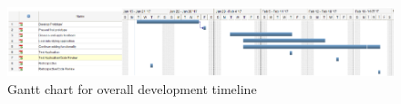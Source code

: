 \begin{figure}[!h]
\begin{center}
\includegraphics[width=15cm]{figures/gantt}
\end{center}
\caption{Gantt chart for overall development timeline}
\label{fig:gantt}
\end{figure}
